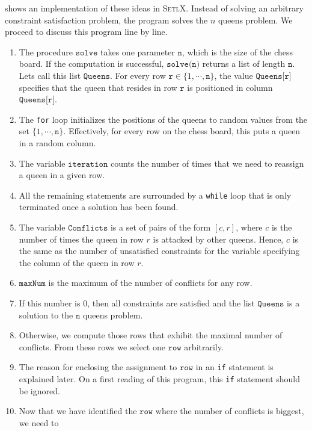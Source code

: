 \noindent
{} shows an implementation of these ideas in \textsc{SetlX}.  Instead of solving an
arbitrary constraint satisfaction problem, the program solves the $n$ queens problem.  We proceed to discuss
this program line by line.
\begin{enumerate}
\item The procedure $\texttt{solve}$ takes one parameter $\texttt{n}$, which is the size of the chess board.  If
      the computation is successful, $\texttt{solve(n)}$ returns a list of length $\texttt{n}$.  Lets call this
      list $\texttt{Queens}$. For every row $\texttt{r} \in \{1, \cdots, \texttt{n}\}$, the value $\texttt{Queens[r]}$ specifies that the queen 
      that resides in row $\texttt{r}$ is positioned in column $\texttt{Queens[r]}$.
\item The \texttt{for} loop initializes the positions of the queens to random values from the set
      $\{1, \cdots, \texttt{n}\}$.  Effectively, for every row on the chess board, this puts a queen in a
      random column.
\item The variable $\texttt{iteration}$ counts the number of times that we need to reassign a queen in a given row.
\item All the remaining statements are surrounded by a \texttt{while} loop that is only terminated once a
      solution has been found.
\item The variable $\texttt{Conflicts}$ is a set of pairs of the form $[c, r]$, where $c$ is the number of
      times the queen in row $r$ is attacked by other queens.  Hence, $c$ is the same as the number of
      unsatisfied constraints for the variable specifying the column of the queen in row $r$.
\item $\texttt{maxNum}$ is the maximum of the number of conflicts for any row.
\item If this number is $0$, then all constraints are satisfied and the list $\texttt{Queens}$ is a solution to the
      $\texttt{n}$ queens problem.
\item Otherwise, we compute those rows that exhibit the maximal number of conflicts.  From these rows
      we select one $\texttt{row}$ arbitrarily.
\item The reason for enclosing the assignment to $\texttt{row}$ in an \texttt{if} statement is explained later. 
      On a first reading of  this program,  this \texttt{if} statement should be ignored.
\item Now that we have identified the $\texttt{row}$ where the number of conflicts is biggest, we need to

\end{enumerate}
